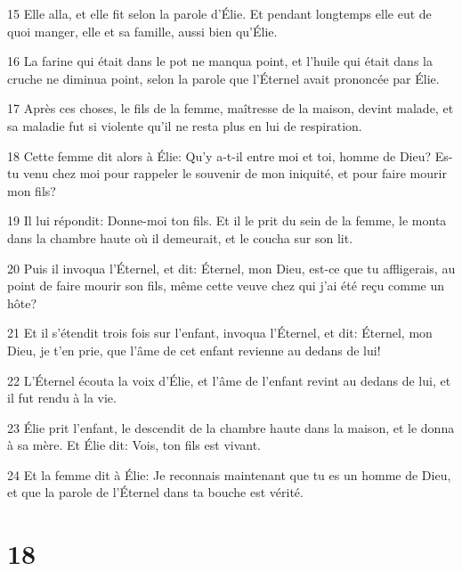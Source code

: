 \par 15 Elle alla, et elle fit selon la parole d'Élie. Et pendant longtemps elle eut de quoi manger, elle et sa famille, aussi bien qu'Élie.
\par 16 La farine qui était dans le pot ne manqua point, et l'huile qui était dans la cruche ne diminua point, selon la parole que l'Éternel avait prononcée par Élie.
\par 17 Après ces choses, le fils de la femme, maîtresse de la maison, devint malade, et sa maladie fut si violente qu'il ne resta plus en lui de respiration.
\par 18 Cette femme dit alors à Élie: Qu'y a-t-il entre moi et toi, homme de Dieu? Es-tu venu chez moi pour rappeler le souvenir de mon iniquité, et pour faire mourir mon fils?
\par 19 Il lui répondit: Donne-moi ton fils. Et il le prit du sein de la femme, le monta dans la chambre haute où il demeurait, et le coucha sur son lit.
\par 20 Puis il invoqua l'Éternel, et dit: Éternel, mon Dieu, est-ce que tu affligerais, au point de faire mourir son fils, même cette veuve chez qui j'ai été reçu comme un hôte?
\par 21 Et il s'étendit trois fois sur l'enfant, invoqua l'Éternel, et dit: Éternel, mon Dieu, je t'en prie, que l'âme de cet enfant revienne au dedans de lui!
\par 22 L'Éternel écouta la voix d'Élie, et l'âme de l'enfant revint au dedans de lui, et il fut rendu à la vie.
\par 23 Élie prit l'enfant, le descendit de la chambre haute dans la maison, et le donna à sa mère. Et Élie dit: Vois, ton fils est vivant.
\par 24 Et la femme dit à Élie: Je reconnais maintenant que tu es un homme de Dieu, et que la parole de l'Éternel dans ta bouche est vérité.

\chapter{18}

